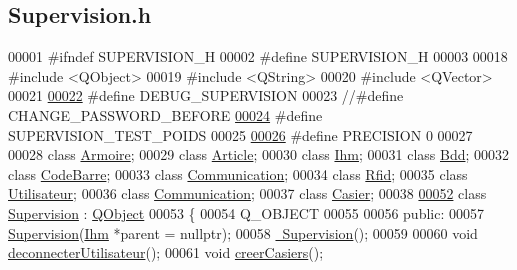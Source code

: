 \hypertarget{_supervision_8h_source}{}\subsection{Supervision.\+h}
\label{_supervision_8h_source}

\begin{DoxyCode}
00001 \textcolor{preprocessor}{#ifndef SUPERVISION\_H}
00002 \textcolor{preprocessor}{#define SUPERVISION\_H}
00003 
00018 \textcolor{preprocessor}{#include <QObject>}
00019 \textcolor{preprocessor}{#include <QString>}
00020 \textcolor{preprocessor}{#include <QVector>}
00021 
\hyperlink{_supervision_8h_ab642f31e36e2a1f5a6758b7f79230a02}{00022} \textcolor{preprocessor}{#define DEBUG\_SUPERVISION}
00023 \textcolor{comment}{//#define CHANGE\_PASSWORD\_BEFORE}
\hyperlink{_supervision_8h_a8e245c4fce9fb512589d2448451ee3e1}{00024} \textcolor{preprocessor}{#define SUPERVISION\_TEST\_POIDS}
00025 
\hyperlink{_supervision_8h_a9c7b069fee3c8184e14a7de8e5da2dc6}{00026} \textcolor{preprocessor}{#define PRECISION 0}
00027 
00028 \textcolor{keyword}{class }\hyperlink{class_armoire}{Armoire};
00029 \textcolor{keyword}{class }\hyperlink{class_article}{Article};
00030 \textcolor{keyword}{class }\hyperlink{class_ihm}{Ihm};
00031 \textcolor{keyword}{class }\hyperlink{class_bdd}{Bdd};
00032 \textcolor{keyword}{class }\hyperlink{class_code_barre}{CodeBarre};
00033 \textcolor{keyword}{class }\hyperlink{class_communication}{Communication};
00034 \textcolor{keyword}{class }\hyperlink{class_rfid}{Rfid};
00035 \textcolor{keyword}{class }\hyperlink{class_utilisateur}{Utilisateur};
00036 \textcolor{keyword}{class }\hyperlink{class_communication}{Communication};
00037 \textcolor{keyword}{class }\hyperlink{class_casier}{Casier};
00038 
\hyperlink{class_supervision}{00052} \textcolor{keyword}{class }\hyperlink{class_supervision}{Supervision} : \hyperlink{class_q_object}{QObject}
00053 \{
00054     Q\_OBJECT
00055 
00056 \textcolor{keyword}{public}:
00057     \hyperlink{class_supervision_af3f0ed8f5aadd6b4aa5e0eac2813d8c4}{Supervision}(\hyperlink{class_ihm}{Ihm} *parent = \textcolor{keyword}{nullptr});
00058     \hyperlink{class_supervision_a5058e6aec3356006c8efe66bf223ec94}{~Supervision}();
00059 
00060     \textcolor{keywordtype}{void} \hyperlink{class_supervision_a164a1ad89264ea252401818df325eab8}{deconnecterUtilisateur}();
00061     \textcolor{keywordtype}{void} \hyperlink{class_supervision_a558665fd7e7c44653907883afd9a58bf}{creerCasiers}();

\end{DoxyCode}

